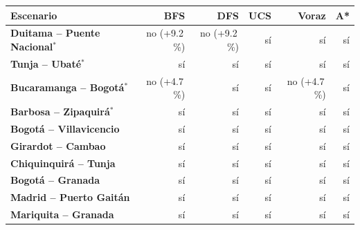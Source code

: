 \renewcommand{\arraystretch}{1.2}
\begin{tabular}{|l|r|r|r|r|r|}
\hline
\rowcolor{gray!20} \textbf{Escenario} & \textbf{BFS} & \textbf{DFS} & \textbf{UCS} & \textbf{Voraz} & \textbf{A*} \\
\hline
\textbf{Duitama -- Puente Nacional$^{*}$} & no (+9.2\,\%) & no (+9.2\,\%) & sí & sí & sí \\
\hline
\textbf{Tunja -- Ubaté$^{*}$} & sí & sí & sí & sí & sí \\
\hline
\textbf{Bucaramanga -- Bogotá$^{*}$} & no (+4.7\,\%) & sí & sí & no (+4.7\,\%) & sí \\
\hline
\textbf{Barbosa -- Zipaquirá$^{*}$} & sí & sí & sí & sí & sí \\
\hline
\textbf{Bogotá -- Villavicencio} & sí & sí & sí & sí & sí \\
\hline
\textbf{Girardot -- Cambao} & sí & sí & sí & sí & sí \\
\hline
\textbf{Chiquinquirá -- Tunja} & sí & sí & sí & sí & sí \\
\hline
\textbf{Bogotá -- Granada} & sí & sí & sí & sí & sí \\
\hline
\textbf{Madrid -- Puerto Gaitán} & sí & sí & sí & sí & sí \\
\hline
\textbf{Mariquita -- Granada} & sí & sí & sí & sí & sí \\
\hline
\end{tabular}
